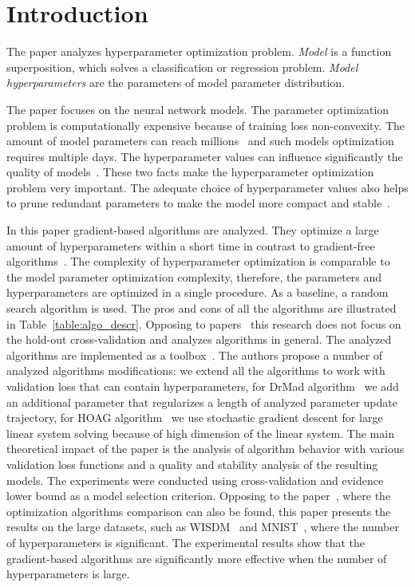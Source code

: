 \documentclass[smallextended]{svjour3}
\begin{document}
\section{Introduction}
\label{intro}
The paper analyzes hyperparameter optimization problem. \textit{Model} is a function superposition, which solves a classification or regression problem. \textit{Model hyperparameters} are the parameters of model parameter distribution.

The paper focuses on the neural network models. The parameter optimization problem is computationally expensive because of training loss non-convexity. The amount of model parameters can reach millions~\cite{hinton_rbm}  and such models optimization requires multiple days\cite{suts}.   The hyperparameter values can influence significantly the quality of models~\cite{journal1,journal2}. These two facts make the hyperparameter optimization problem very important. The adequate choice of hyperparameter values also helps to prune redundant parameters to make the model more compact and stable~\cite{nips,ard}.

In this paper gradient-based algorithms are analyzed. They optimize a large amount of hyperparameters within a short time in contrast to gradient-free algorithms~\cite{hyper}.  The complexity of hyperparameter optimization is comparable to the model parameter optimization complexity, therefore, the parameters and hyperparameters are  optimized in a single procedure. As a baseline, a random search algorithm is used. The pros and cons of all the algorithms  
are illustrated in Table~\ref{table:algo_descr}. Opposing to papers~\cite{hyper_mad,hyper_hoag,hyper_greed} this research does not focus on the hold-out cross-validation and analyzes algorithms in general. The analyzed algorithms are implemented as a toolbox~\cite{pyfos}. The authors propose a number of analyzed algorithms modifications: we extend all the algorithms to work with validation loss that can contain hyperparameters, for DrMad algorithm~\cite{hyper_mad} we add an additional parameter that regularizes a length of analyzed parameter update trajectory, for HOAG algorithm~\cite{hyper_hoag} we use stochastic gradient descent for large linear system solving because of high dimension of the linear system.   The main theoretical impact of the paper is the analysis of algorithm behavior with various validation loss functions and a quality and stability analysis of the resulting models. The experiments were conducted using cross-validation and evidence lower bound as a model selection criterion. Opposing to the paper~\cite{hyper_hoag}, where  the optimization algorithms comparison can also be found, this paper presents the results on the large datasets, such as  WISDM~\cite{wisdm} and MNIST~\cite{mnist}, where the number of hyperparameters is significant. 
The experimental results show that the gradient-based algorithms are significantly more effective when the number of hyperparameters is large. 
\end{document}
